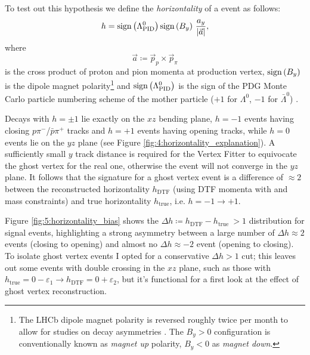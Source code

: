 To test out this hypothesis we define the \textit{horizontality} of a \lambdadecay event as follows:
\begin{equation}
h = \operatorname{sign}{\left(\Lambda^0_\text{PID}\right)} \operatorname{sign}{\left(B_y\right)}~\frac{a_y}{\lvert \vec{a} \rvert},
\label{eq:4:horizontality}
\end{equation}
where
\begin{equation}
\vec{a} \coloneqq \vec{p}_p \times \vec{p}_\pi 
\end{equation}
is the cross product of proton and pion momenta at production vertex, $\operatorname{sign}{\left(B_y\right)}$ is the dipole magnet polarity\footnote{The LHCb dipole magnet polarity is reversed roughly twice per month to allow for studies on decay asymmetries \cite{Vesterinen:1642153}. The $B_y > 0$ configuration is conventionally known as \textit{magnet up} polarity, $B_y < 0$ as \textit{magnet down}.}
and $\operatorname{sign}{\left(\Lambda^0_\text{PID}\right)}$ is the sign of the PDG Monte Carlo particle numbering scheme of the mother particle ($+1$ for $\Lambda^0$, $-1$ for $\bar{\Lambda}^0$) \cite{PDG}.

Decays with $h=\pm1$ lie exactly on the $xz$ bending plane, $h=-1$ events having closing $p\pi^-$/$\bar{p}\pi^+$ tracks and $h=+1$ events having opening tracks, while $h=0$ events lie on the $yz$ plane (see Figure \ref{fig:4:horizontality_explanation}).
A sufficiently small $y$ track distance is required for the Vertex Fitter to equivocate the ghost vertex for the real one, otherwise the event will not converge in the $yz$ plane.
It follows that the signature for a ghost vertex event is a difference of $\approx 2$ between the reconstructed horizontality $h_\text{DTF}$ (using DTF momenta with \jpsi and \lz mass constraints) and true horizontality $h_\text{true}$, i.e. $h=-1 \rightarrow +1$.

Figure \ref{fig:5:horizontality_bias} shows the $\Delta h \coloneqq  h_\text{DTF} - h_\text{true } > 1$ distribution for signal \lambdadecay events, highlighting a strong asymmetry between a large number of $\Delta h \approx 2$ events (closing to opening) and almost no $\Delta h \approx -2$ event (opening to closing).
To isolate ghost vertex events I opted for a conservative $\Delta h > 1$ cut;
this leaves out some events with double crossing in the $xz$ plane, such as those with $h_\text{true} = 0-\varepsilon_1 \rightarrow h_\text{DTF} = 0+\varepsilon_2$, but it's functional for a first look at the effect of ghost vertex reconstruction.

